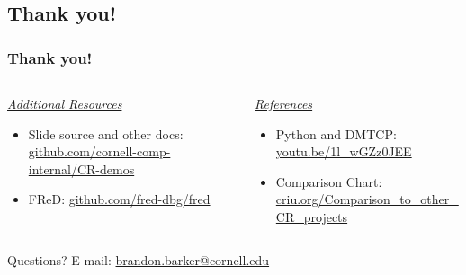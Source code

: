 \documentclass[compress]{beamer}
\begin{document}

\subsection{Thank you!}
\begin{frame}
\frametitle{Thank you!} 

\begin{columns}[t]
%
\begin{column}{0.5\textwidth}
\ul{\textit{Additional Resources}}
\begin{itemize}
\item Slide source and other docs: \url{github.com/cornell-comp-internal/CR-demos}
\item FReD: \url{github.com/fred-dbg/fred}
\end{itemize}
\end{column}

\begin{column}{0.5\textwidth}
\ul{\textit{References}}
\begin{itemize}
\item Python and DMTCP: \url{youtu.be/1l_wGZz0JEE}
\item Comparison Chart: \url{criu.org/Comparison_to_other_CR_projects}
\end{itemize}

\vspace{0.4in}


\end{column}

%
\end{columns}

\vspace{0.4in}
Questions? E-mail: \url{brandon.barker@cornell.edu}
\end{frame}

  


\end{document}
